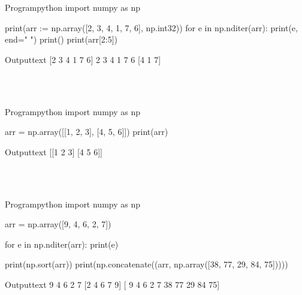 \documentclass[11pt]{ipu-python}
\begin{document}
    \begin{code}
        {Program}{python}
import numpy as np

print(arr := np.array([2, 3, 4, 1, 7, 6], np.int32))
for e in np.nditer(arr):
    print(e, end=" ")
print()
print(arr[2:5])
    \end{code}
    \begin{code}
        {Output}{text}
[2 3 4 1 7 6]
2 3 4 1 7 6
[4 1 7]
    \end{code}

    \\~\\
    \begin{code}
        {Program}{python}
import numpy as np

arr = np.array([[1, 2, 3], [4, 5, 6]])
print(arr)
    \end{code}
    \begin{code}
        {Output}{text}
[[1 2 3]
 [4 5 6]]
    \end{code}

    \\~\\
    \begin{code}
        {Program}{python}
import numpy as np

arr = np.array([9, 4, 6, 2, 7])

for e in np.nditer(arr):
    print(e)

print(np.sort(arr))
print(np.concatenate((arr, np.array([38, 77, 29, 84, 75]))))
    \end{code}
    \begin{code}
        {Output}{text}
9
4
6
2
7
[2 4 6 7 9]
[ 9  4  6  2  7 38 77 29 84 75]
    \end{code}
\end{document}
